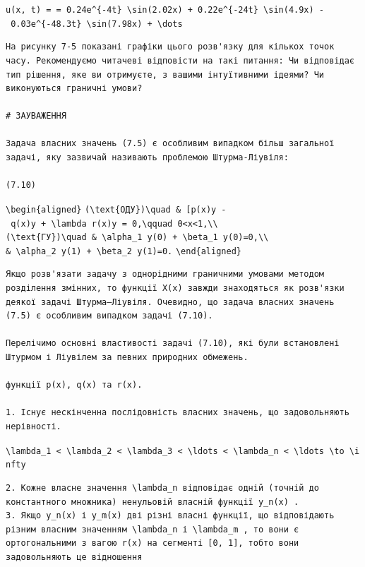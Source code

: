 \documentclass[
  ukrainian,
]{article}
\begin{document}
\texttt{u(x,\ t)\ =\ =\ 0.24e\^{}\{-4t\}\ \textbackslash{}sin(2.02x)\ +\ 0.22e\^{}\{-24t\}\ \textbackslash{}sin(4.9x)\ -\ 0.03e\^{}\{-48.3t\}\ \textbackslash{}sin(7.98x)\ +\ \textbackslash{}dots}

\begin{verbatim}
На рисунку 7-5 показані графіки цього розв'язку для кількох точок часу. Рекомендуємо читачеві відповісти на такі питання: Чи відповідає тип рішення, яке ви отримуєте, з вашими інтуїтивними ідеями? Чи виконуються граничні умови?

# ЗАУВАЖЕННЯ

Задача власних значень (7.5) є особливим випадком більш загальної задачі, яку зазвичай називають проблемою Штурма-Ліувіля:

(7.10)
\end{verbatim}

\texttt{\textbackslash{}begin\{aligned\}}
\texttt{(\textbackslash{}text\{ОДУ\})\textbackslash{}quad\ \&\ {[}p(x)y\textquotesingle{}{]}\textquotesingle{}\ -\ q(x)y\ +\ \textbackslash{}lambda\ r(x)y\ =\ 0,\textbackslash{}qquad\ 0\textless{}x\textless{}1,\textbackslash{}\textbackslash{}}
\texttt{(\textbackslash{}text\{ГУ\})\textbackslash{}quad\ \&\ \textbackslash{}alpha\_1\ y(0)\ +\ \textbackslash{}beta\_1\ y\textquotesingle{}(0)=0,\textbackslash{}\textbackslash{}}
\texttt{\&\ \textbackslash{}alpha\_2\ y(1)\ +\ \textbackslash{}beta\_2\ y\textquotesingle{}(1)=0.}
\texttt{\textbackslash{}end\{aligned\}}

\begin{verbatim}
Якщо розв'язати задачу з однорідними граничними умовами методом розділення змінних, то функції X(x) завжди знаходяться як розв'язки деякої задачі Штурма–Ліувіля. Очевидно, що задача власних значень (7.5) є особливим випадком задачі (7.10).

Перелічимо основні властивості задачі (7.10), які були встановлені Штурмом і Ліувілем за певних природних обмежень.

функції p(x), q(x) та r(x).

1. Існує нескінченна послідовність власних значень, що задовольняють нерівності.
\end{verbatim}

\texttt{\textbackslash{}lambda\_1\ \textless{}\ \textbackslash{}lambda\_2\ \textless{}\ \textbackslash{}lambda\_3\ \textless{}\ \textbackslash{}ldots\ \textless{}\ \textbackslash{}lambda\_n\ \textless{}\ \textbackslash{}ldots\ \textbackslash{}to\ \textbackslash{}infty}

\begin{verbatim}
2. Кожне власне значення \lambda_n відповідає одній (точній до константного множника) ненульовій власній функції y_n(x) .
3. Якщо y_n(x) і y_m(x) дві різні власні функції, що відповідають різним власним значенням \lambda_n і \lambda_m , то вони є ортогональними з вагою r(x) на сегменті [0, 1], тобто вони задовольняють це відношення
\end{verbatim}
\end{document}
